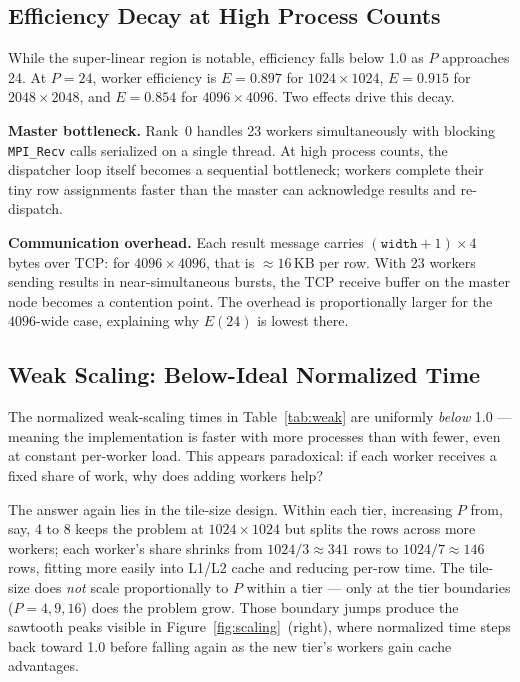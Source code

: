 \documentclass[11pt]{article}
\begin{document}
\subsection{Efficiency Decay at High Process Counts}

While the super-linear region is notable, efficiency falls below 1.0 as $P$
approaches 24. At $P = 24$, worker efficiency is $E = 0.897$ for
$1024\times1024$, $E = 0.915$ for $2048\times2048$, and $E = 0.854$ for
$4096\times4096$. Two effects drive this decay.

\textbf{Master bottleneck.} Rank~0 handles 23 workers simultaneously with
blocking \texttt{MPI\_Recv} calls serialized on a single thread. At high
process counts, the dispatcher loop itself becomes a sequential bottleneck;
workers complete their tiny row assignments faster than the master can
acknowledge results and re-dispatch.

\textbf{Communication overhead.} Each result message carries $(\texttt{width}
+ 1) \times 4$ bytes over TCP: for $4096\times4096$, that is $\approx 16$\,KB
per row. With 23 workers sending results in near-simultaneous bursts, the TCP
receive buffer on the master node becomes a contention point. The overhead is
proportionally larger for the $4096$-wide case, explaining why $E(24)$ is
lowest there.

\subsection{Weak Scaling: Below-Ideal Normalized Time}

The normalized weak-scaling times in Table~\ref{tab:weak} are uniformly
\textit{below} 1.0 — meaning the implementation is faster with more processes
than with fewer, even at constant per-worker load. This appears paradoxical:
if each worker receives a fixed share of work, why does adding workers help?

The answer again lies in the tile-size design. Within each tier, increasing
$P$ from, say, 4 to 8 keeps the problem at $1024\times1024$ but splits the
rows across more workers; each worker's share shrinks from $1024/3 \approx 341$
rows to $1024/7 \approx 146$ rows, fitting more easily into L1/L2 cache and
reducing per-row time. The tile-size does \textit{not} scale proportionally to
$P$ within a tier — only at the tier boundaries ($P = 4, 9, 16$) does the
problem grow. Those boundary jumps produce the sawtooth peaks visible in
Figure~\ref{fig:scaling}~(right), where normalized time steps back toward 1.0
before falling again as the new tier's workers gain cache advantages.
\end{document}
